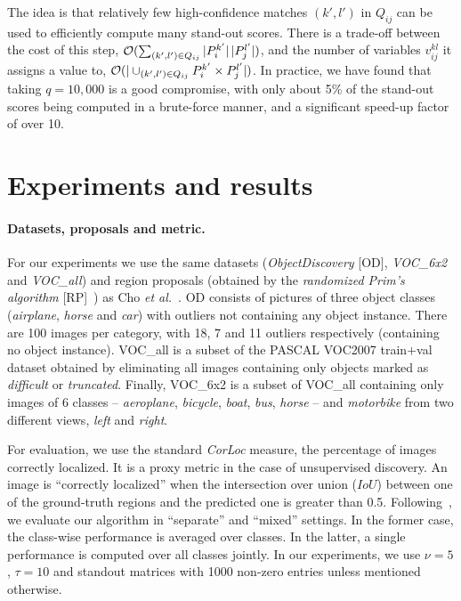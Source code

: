 \documentclass[10pt,twocolumn,letterpaper]{article}
\numberwithin{theorem}{section}
\begin{document}
The idea is  that relatively few high-confidence matches $(k',l')$ in $Q_{ij}$
can be used to efficiently compute many stand-out scores. There is
a trade-off between the cost of this step, ${\cal O}(\sum_{(k',l')\in Q_{ij}}
|P_i^{k'}|\,|P_j^{l'}|)$, and the number of variables $v_{ij}^{kl}$ it assigns
a value to, ${\cal O}(|\cup_{(k',l') \in Q_{ij}}P_i^{k'}\times P_j^{l'}|)$. In practice, we have
found that taking $q=10,000$ is a good compromise, with only about 5\%
of the stand-out scores being computed in a brute-force manner, and
a significant speed-up factor of over 10. 
\section{Experiments and results}
\paragraph{Datasets, proposals and metric.} 

For our experiments we use the same datasets ({\em ObjectDiscovery} [OD],
{\em VOC\_6x2} and {\em VOC\_all}) and region proposals (obtained by
the {\em randomized Prim's algorithm} [RP]~\cite{manen2013prime}) as Cho {\em et al.}~\cite{CKSP15}.  
OD consists of pictures of three object classes (\textit{airplane},
\textit{horse} and \textit{car}) with outliers not containing any
object instance. There are 100 images per category, with 18, 7 and 11
outliers respectively (containing no object instance).
VOC\_all is a subset of the PASCAL VOC2007
train$+$val dataset obtained by eliminating all images containing only
objects marked as \textit{difficult} or \textit{truncated}. Finally,
VOC\_6x2 is a subset of VOC\_all containing only images of 6
classes -- {\em aeroplane}, {\em bicycle}, {\em boat}, {\em bus}, {\em
  horse} -- and {\em motorbike} from two different views, \textit{left}
and \textit{right}.

For evaluation, we use the standard \textit{CorLoc} measure, the percentage of images
correctly localized. It is a proxy metric in the case of unsupervised discovery.
An image is ``correctly localized'' when the intersection over union ($IoU$) between one
of the ground-truth regions and the predicted one is greater than
0.5. Following~\cite{CKSP15}, we evaluate our algorithm in ``separate'' 
and ``mixed'' settings. In the former case, the class-wise performance is averaged over classes. In the latter, a single performance is computed over all classes jointly. In our experiments, we use $\nu=5$, $\tau=10$ and standout matrices with 1000 non-zero entries unless mentioned otherwise.
\end{document}
